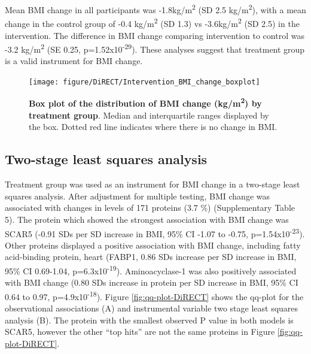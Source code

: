 \documentclass[11pt,twoside]{bristolthesis}
\begin{document}
Mean BMI change in all participants was -1.8kg/m\textsuperscript{2} (SD 2.5 kg/m\textsuperscript{2}), with a mean change in the control group of -0.4 kg/m\textsuperscript{2} (SD 1.3) vs -3.6kg/m\textsuperscript{2} (SD 2.5) in the intervention. The difference in BMI change comparing intervention to control was -3.2 kg/m\textsuperscript{2} (SE 0.25, p=1.52x10\textsuperscript{-29}). These analyses suggest that treatment group is a valid instrument for BMI change.



\begin{figure}

{\centering \texttt{[image: figure/DiRECT/Intervention\_BMI\_change\_boxplot]} 

}

\caption[Box plot of the distribution of BMI change (kg/m\textsuperscript{2}) by treatment group]{\textbf{Box plot of the distribution of BMI change (kg/m\textsuperscript{2}) by treatment group}. Median and interquartile ranges displayed by the box. Dotted red line indicates where there is no change in BMI.}\label{fig:box-BMI-change}
\end{figure}
\hypertarget{two-stage-least-squares-analysis}{%
\subsection{Two-stage least squares analysis}\label{two-stage-least-squares-analysis}}

Treatment group was used as an instrument for BMI change in a two-stage least squares analysis. After adjustment for multiple testing, BMI change was associated with changes in levels of 171 proteins (3.7 \%) (Supplementary Table 5). The protein which showed the strongest association with BMI change was SCAR5 (-0.91 SDs per SD increase in BMI, 95\% CI -1.07 to -0.75, p=1.54x10\textsuperscript{-23}). Other proteins displayed a positive association with BMI change, including fatty acid-binding protein, heart (FABP1, 0.86 SDs increase per SD increase in BMI, 95\% CI 0.69-1.04, p=6.3x10\textsuperscript{-19}). Aminoacyclase-1 was also positively associated with BMI change (0.80 SDs increase in protein per SD increase in BMI, 95\% CI 0.64 to 0.97, p=4.9x10\textsuperscript{-18}). Figure \ref{fig:qq-plot-DiRECT} shows the qq-plot for the observational associations (A) and instrumental variable two stage least squares analysis (B). The protein with the smallest observed P value in both models is SCAR5, however the other ``top hits'' are not the same proteins in Figure \ref{fig:qq-plot-DiRECT}.
\end{document}
